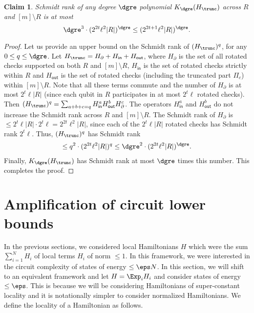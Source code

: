 \documentclass[11pt]{article}
\newtheorem{claim}[theorem]{Claim}
\begin{document}
\begin{claim}
\label{clm:schmidtrank}
Schmidt rank of any degree $\dgre$ polynomial $K_{\dgre}(H_{\trunc})$ across $R$ and $[m]\setminus R$ is at most 
\begin{align}\dgre^3\cdot (2^{2t}\ell^2|R|)^{\dgre}\leq (2^{2t+1}\ell^2|R|)^{\dgre}.
\end{align}
\end{claim}
\begin{proof}
Let us provide an upper bound on the Schmidt rank of $(H_{\trunc})^q$, for any $0\leq q \leq \dgre$. Let $H_{\trunc}= H_{\partial} + H_{\mathsf{in}} + H_{\mathsf{out}}$, where $H_{\partial}$ is the set of all rotated checks supported on both $R$ and $[m]\setminus R$, $H_{\mathsf{in}}$ is the set of rotated checks strictly within $R$ and $H_{\mathsf{out}}$ is the set of rotated checks (including the truncated part $\Pi_c$) within $[m]\setminus R$. Note that all these terms commute and the number of $H_{\partial}$ is at most $2^t\ell|R|$ (since each qubit in $R$ participates in at most $2^t\ell$ rotated checks). Then $(H_{\trunc})^q= \sum_{a+b+c=q}H_{\mathsf{in}}^a H_{\mathsf{out}}^b H_{\partial}^c$. The operators $H_{\mathsf{in}}^a$ and $H_{\mathsf{out}}^b$ do not increase the Schmidt rank across $R$ and $[m]\setminus R$. The Schmidt rank of $H_{\partial}$ is $\leq 2^t\ell|R|\cdot 2^t\ell = 2^{2t}\ell^2|R|$, since each of the $2^t\ell|R|$ rotated checks has Schmidt rank $2^t\ell$. Thus, $(H_{\trunc})^q$ has Schmidt rank 
\begin{align}\leq q^2\cdot (2^{2t}\ell^2|R|)^q\leq \dgre^2\cdot (2^{2t}\ell^2|R|)^{\dgre}.\end{align} Finally, $K_{\dgre}(H_{\trunc})$ has Schmidt rank at most $\dgre$ times this number. This completes the proof.
\end{proof}

\section{Amplification of circuit lower bounds}

\label{sec:amplification}



In the previous sections, we considered local Hamiltonians $H$ which were the sum $\sum_{i = 1}^N H_i$ of local terms $H_i$ of norm $\leq 1$. In this framework, we were interested in the circuit complexity of states of energy $\leq \eps N$. In this section, we will shift to an equivalent framework and let $H = \Exp_i H_i$ and consider states of energy $\leq \eps$. 
This is because we will be considering Hamiltonians of super-constant locality and it is notationally simpler to consider normalized Hamiltonians.
We define the locality of a Hamiltonian as follows.
\end{document}

